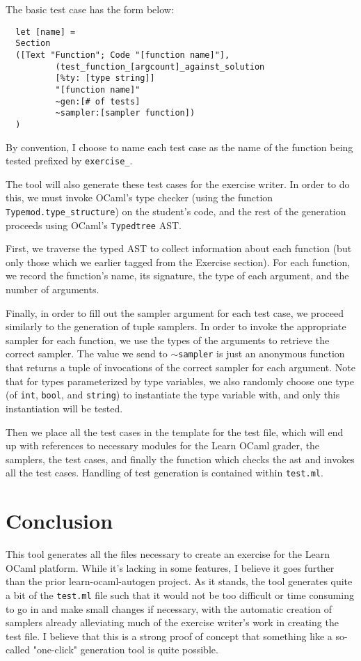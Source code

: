 \documentclass[11pt]{article}
\begin{document}
The basic test case has the form below:

\begin{lstlisting}
  let [name] =
  Section
  ([Text "Function"; Code "[function name]"],
          (test_function_[argcount]_against_solution
          [%ty: [type string]]
          "[function name]"
          ~gen:[# of tests]
          ~sampler:[sampler function])
  )
\end{lstlisting}

By convention, I choose to name each test case as the name of the function being tested prefixed by \verb+exercise_+. 

The tool will also generate these test cases for the exercise writer. In order to do this, we must invoke OCaml's type checker (using the function \verb+Typemod.type_structure+) on the student's code, and the rest of the generation proceeds using OCaml's \verb+Typedtree+ AST.

First, we traverse the typed AST to collect information about each function (but only those which we earlier tagged from the Exercise section). For each function, we record the function's name, its signature, the type of each argument, and the number of arguments.

Finally, in order to fill out the sampler argument for each test case, we proceed similarly to the generation of tuple samplers. In order to invoke the appropriate sampler for each function, we use the types of the arguments to retrieve the correct sampler. The value we send to $\sim$\verb+sampler+ is just an anonymous function that returns a tuple of invocations of the correct sampler for each argument. Note that for types parameterized by type variables, we also randomly choose one type (of \verb+int+, \verb+bool+, and \verb+string+) to instantiate the type variable with, and only this instantiation will be tested.

Then we place all the test cases in the template for the test file, which will end up with references to necessary modules for the Learn OCaml grader, the samplers, the test cases, and finally the function which checks the ast and invokes all the test cases. Handling of test generation is contained within \verb+test.ml+.

\section{Conclusion}
This tool generates all the files necessary to create an exercise for the Learn OCaml platform. While it's lacking in some features, I believe it goes further than the prior learn-ocaml-autogen project. As it stands, the tool generates quite a bit of the \verb+test.ml+ file such that it would not be too difficult or time consuming to go in and make small changes if necessary, with the automatic creation of samplers already alleviating much of the exercise writer's work in creating the test file. I believe that this is a strong proof of concept that something like a so-called "one-click" generation tool is quite possible.
\end{document}
